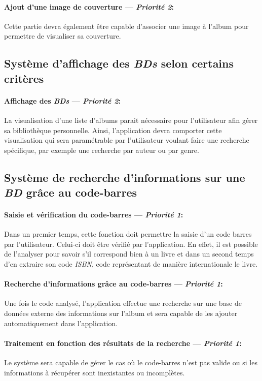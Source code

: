 \paragraph{Ajout d'une image de couverture ---  \textit{Priorité 2}:}  
Cette partie devra également être capable d'associer une image à l'album pour permettre de visualiser sa couverture.

\subsection{Système d'affichage des \emph{BDs} selon certains critères}

\paragraph{Affichage des \emph{BDs} ---  \textit{Priorité 2}:}

La visualisation d'une liste d'albums parait nécessaire pour l'utilisateur afin gérer sa bibliothèque personnelle. Ainsi, l'application devra comporter cette visualisation qui sera paramétrable par l'utilisateur voulant faire une recherche spécifique, par exemple une recherche par auteur ou par genre.

\subsection{Système de recherche d'informations sur une \emph{BD}  grâce au code-barres}

\paragraph{Saisie et vérification du code-barres ---  \textit{Priorité 1}:}
Dans un premier temps, cette fonction doit permettre la saisie d'un code barres par l'utilisateur. 
Celui-ci doit être vérifié par l'application. En effet, il est possible de l'analyser pour savoir s'il correspond bien à un livre et dans un second temps d'en extraire son code \emph{ISBN}, code représentant de manière internationale le livre.
\paragraph{Recherche d'informations grâce au code-barres ---  \textit{Priorité 1}:}  
Une fois le code analysé, l'application effectue une recherche sur une base de données externe des informations sur l'album et sera capable de les ajouter automatiquement dans l'application.
\paragraph{Traitement en fonction des résultats de la recherche ---  \textit{Priorité 1}:}  
Le système sera capable de gérer le cas où le code-barres n'est pas valide ou si les informations à récupérer sont inexistantes ou incomplètes.

